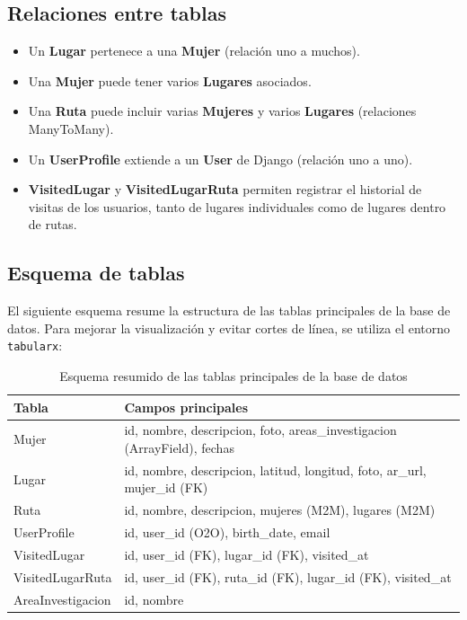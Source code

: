 \subsection{Relaciones entre tablas}

\begin{itemize}
    \item Un \textbf{Lugar} pertenece a una \textbf{Mujer} (relación uno a muchos).
    \item Una \textbf{Mujer} puede tener varios \textbf{Lugares} asociados.
    \item Una \textbf{Ruta} puede incluir varias \textbf{Mujeres} y varios \textbf{Lugares} (relaciones ManyToMany).
    \item Un \textbf{UserProfile} extiende a un \textbf{User} de Django (relación uno a uno).
    \item \textbf{VisitedLugar} y \textbf{VisitedLugarRuta} permiten registrar el historial de visitas de los usuarios, tanto de lugares individuales como de lugares dentro de rutas.
\end{itemize}

\subsection{Esquema de tablas}

El siguiente esquema resume la estructura de las tablas principales de la base de datos. Para mejorar la visualización y evitar cortes de línea, se utiliza el entorno \texttt{tabularx}:

\begin{table}[H]
\centering
\begin{tabularx}{\textwidth}{l X}
\textbf{Tabla} & \textbf{Campos principales} \\
\hline
Mujer & id, nombre, descripcion, foto, areas\_investigacion (ArrayField), fechas \\
Lugar & id, nombre, descripcion, latitud, longitud, foto, ar\_url, mujer\_id (FK) \\
Ruta & id, nombre, descripcion, mujeres (M2M), lugares (M2M) \\
UserProfile & id, user\_id (O2O), birth\_date, email \\
VisitedLugar & id, user\_id (FK), lugar\_id (FK), visited\_at \\
VisitedLugarRuta & id, user\_id (FK), ruta\_id (FK), lugar\_id (FK), visited\_at \\
AreaInvestigacion & id, nombre \\
\end{tabularx}
\caption{Esquema resumido de las tablas principales de la base de datos}
\end{table}

